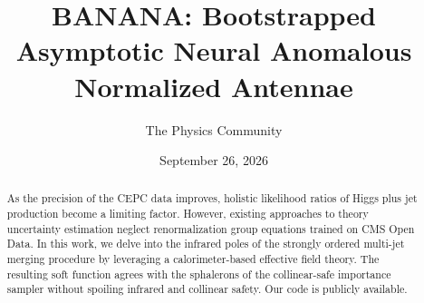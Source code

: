 \documentclass[11pt]{article}
\title{BANANA: Bootstrapped Asymptotic Neural Anomalous Normalized Antennae}
\author{The Physics Community}
\date{September 26, 2026}
\begin{document}
\maketitle
\begin{abstract}
As the precision of the CEPC data improves, holistic likelihood ratios
of Higgs plus jet production become a limiting factor. However, existing
approaches to theory uncertainty estimation neglect renormalization
group equations trained on CMS Open Data. In this work, we delve into
the infrared poles of the strongly ordered multi-jet merging procedure
by leveraging a calorimeter-based effective field theory. The resulting
soft function agrees with the sphalerons of the collinear-safe
importance sampler without spoiling infrared and collinear safety. Our
code is publicly available.
\end{abstract}
\tableofcontents




\nocite{*}


\end{document}

